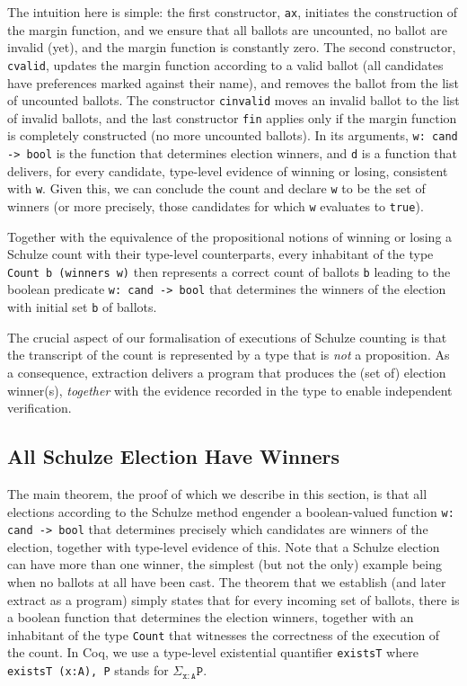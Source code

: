 \noindent
The intuition here is simple: the first constructor, \texttt{ax},
initiates the construction of the margin function, and we ensure
that all ballots are uncounted, no ballot are invalid (yet), and the
margin function is constantly zero. The second constructor,
\texttt{cvalid}, updates the margin function according to a valid
ballot (all candidates have preferences marked against their name),
and removes the ballot from the list of uncounted ballots. The
constructor \texttt{cinvalid} moves an invalid ballot to the list of
invalid ballots, and the last constructor \texttt{fin} applies only
if the margin function is completely constructed (no more uncounted
ballots). In its arguments, \texttt{w: cand -> bool} is the function
that determines election winners, and \texttt{d} is a function that
delivers, for every candidate, type-level evidence of winning or
losing, consistent with \texttt{w}. Given this, we can conclude the
count and declare \texttt{w} to be the set of winners (or more
precisely, those candidates for which \texttt{w} evaluates to
\texttt{true}). 

Together with the equivalence of the propositional notions of
winning or losing a Schulze count with their type-level
counterparts, every inhabitant of the type \texttt{Count b (winners
w)} then represents a correct count of ballots \texttt{b} leading to
the boolean predicate \texttt{w: cand -> bool} that determines the
winners of the election with initial set \texttt{b} of ballots.

The crucial aspect of our formalisation of executions of Schulze
counting is that the transcript of the count is represented by a
type that is \emph{not} a proposition. As a consequence, extraction
delivers a program that produces the (set of) election winner(s),
\emph{together} with the evidence recorded in the type to enable
independent verification.




\subsection{All Schulze Election Have Winners}

The main theorem, the proof of which we describe in this section, is
that all elections according to the Schulze method engender a
boolean-valued function \texttt{w: cand -> bool}
that determines
precisely which candidates are winners of the election, together
with type-level evidence of this.
Note that a Schulze election can have more
than one winner, the simplest (but not the only) example being when
no ballots at all have been cast.
The theorem that we establish (and later extract as a program)
simply states that for every incoming set of ballots, there is a
boolean function that determines the election winners, together with
an inhabitant of the type \texttt{Count} that witnesses the
correctness of the execution of the count. In Coq, we use a
type-level existential quantifier \texttt{existsT} where
\texttt{existsT (x:A), P} stands for $\Sigma_{\mathtt{x:A}}
\texttt{P}$.

